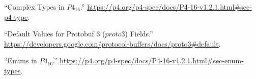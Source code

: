 \documentclass[11pt]{article}
\begin{document}
{{\begin{thebibliography}{44}
\mdbibitemlabel{{}[4]}\textquotedblleft{}Complex Types in $P4_{16}$.\textquotedblright{} \href{https://p4.org/p4-spec/docs/P4-16-v1.2.1.html\%23sec-p4-type}{{\ttfamily https://\hspace{0pt}p4.\hspace{0pt}org/\hspace{0pt}p4-\hspace{0pt}spec/\hspace{0pt}docs/\hspace{0pt}P4-\hspace{0pt}16-\hspace{0pt}v1.\hspace{0pt}2.\hspace{0pt}1.\hspace{0pt}html\#\hspace{0pt}sec-\hspace{0pt}p4-\hspace{0pt}type}}.\label{p4complextypes}%

\mdbibitemlabel{{}[5]}\textquotedblleft{}Default Values for Protobuf 3 ($proto3$) Fields.\textquotedblright{} \href{https://developers.google.com/protocol-buffers/docs/proto3\%23default}{{\ttfamily https://\hspace{0pt}developers.\hspace{0pt}google.\hspace{0pt}com/\hspace{0pt}protocol-\hspace{0pt}buffers/\hspace{0pt}docs/\hspace{0pt}proto3\#\hspace{0pt}default}}.\label{protodefaults}%

\mdbibitemlabel{{}[6]}\textquotedblleft{}Enums in $P4_{16}$.\textquotedblright{} \href{https://p4.org/p4-spec/docs/P4-16-v1.2.1.html\%23sec-enum-types}{{\ttfamily https://\hspace{0pt}p4.\hspace{0pt}org/\hspace{0pt}p4-\hspace{0pt}spec/\hspace{0pt}docs/\hspace{0pt}P4-\hspace{0pt}16-\hspace{0pt}v1.\hspace{0pt}2.\hspace{0pt}1.\hspace{0pt}html\#\hspace{0pt}sec-\hspace{0pt}enum-\hspace{0pt}types}}.\label{p4enums}%


\end{thebibliography}}}
\end{document}
